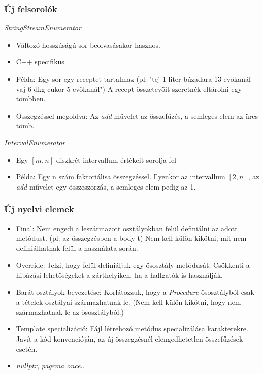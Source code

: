 \documentclass[11pt]{beamer}
\begin{document}
\begin{frame}
	\frametitle{Új felsorolók}
		 \textit{StringStreamEnumerator} 
		 \begin{itemize}
		 	\item Változó hosszúságú sor beolvasásakor hasznos.
		 	\item C++ specifikus
		 	\item Példa: Egy sor egy receptet tartalmaz (pl: "tej 1 liter búzadara 13 evőkanál vaj 6 dkg cukor 5 evőkanál") A recept összetevőit szeretnék eltárolni egy tömbben.
		 	\item Összegzéssel megoldva: Az \textit{add} művelet az összefűzés, a semleges elem az üres tömb.
		 \end{itemize}
		
		\textit{IntervalEnumerator}
		\begin{itemize}
			\item Egy $[m,n]$ diszkrét intervallum értékeit sorolja fel
			\item Példa: Egy n szám faktoriálisa összegzéssel. Ilyenkor az intervallum $[2,n]$, az \textit{add} művelet egy összeszorzás, a semleges elem pedig az 1.
		\end{itemize}
		
\end{frame}

\begin{frame}
	\frametitle{Új nyelvi elemek}
	\begin{itemize}
		\item Final: Nem engedi a leszármazott osztályokban felül definiálni az adott metódust. (pl. az összegzésben a body-t) Nem kell külön kikötni, mit nem definiálhatnak felül a használata során.
		\item Override: Jelzi, hogy felül definiáljuk egy ősosztály metódusát. Csökkenti a hibázási lehetőségeket a zárthelyiken, ha a hallgatók is használják.
		\item Barát osztályok bevezetése: Korlátozzuk, hogy a \textit{Procedure} ősosztályból csak a tételek osztályai származhatnak le. (Nem kell külön kikötni, hogy nem származhatnak le az ősosztályból.)
		\item Template specializáció: Fájl létrehozó metódus specializálása karakterekre. Javít a kód konvencióján, az új összegzésnél elengedhetetlen összefűzések esetén.
		\item \textit{nullptr}, \textit{pagrma once}..
	\end{itemize}
\end{frame}
\end{document}
